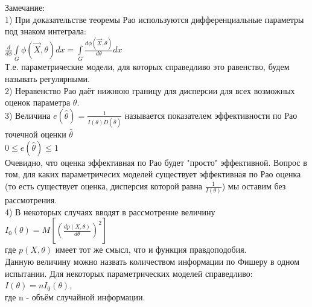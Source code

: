 Замечание:\\
1) При доказательстве теоремы Рао используются дифференциальные параметры под знаком интеграла:\\
$\frac{d}{d\phi}\int\limits_{G}\phi(\overrightarrow{X}, \theta)dx = \int\limits_{G} \frac{d\phi(\overrightarrow{X}, \theta)}{d\theta}dx$\\
Т.е. параметрические модели, для которых справедливо это равенство, будем называть регулярными. \\
2) Неравенство Рао даёт нижнюю границу для дисперсии для всех возможных оценок параметра $\theta$.\\
3) Величина $e(\hat{\theta}) = \frac{1}{I(\theta)D(\hat{\theta})}$ называется показателем эффективности по Рао точечной оценки $\hat{\theta}$\\
$0 \leqslant e(\hat{\theta}) \leqslant 1$\\
Очевидно, что оценка эффективная по Рао будет "просто"  эффективной. Вопрос в том, для каких параметричесих моделей существует эффективная по Рао оценка (то есть существует оценка, дисперсия которой равна $\frac{1}{I(\theta)}$) мы оставим без рассмотрения.\\
4) В некоторых случаях вводят в рассмотрение величину $I_{0} (\theta) = M[(\frac{dp(X, \theta)}{d\theta})^{2}]$\\
где $p(X, \theta)$ имеет тот же смысл, что и функция правдоподобия.\\
Данную величину можно назвать количеством информации по Фишеру в одном испытании. Для некоторых параметрических моделей справедливо:\\
$I(\theta) = nI_{0}(\theta)$,\\
где n - объём случайной информации.\\

